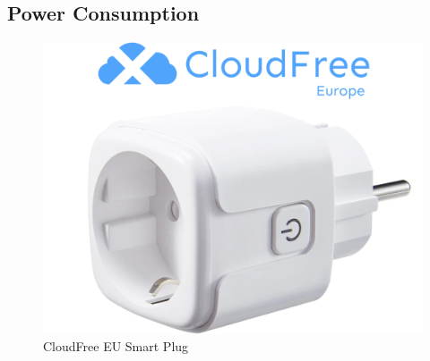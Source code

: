\subsection{Power Consumption}
\label{subsec:implementation_installer_power_consumption}

\begin{figure}
  \centering
  \includegraphics[width=\linewidth]{images/implementation/plug.png}
  \caption{CloudFree EU Smart Plug}
  \label{fig:plug}
\end{figure}


